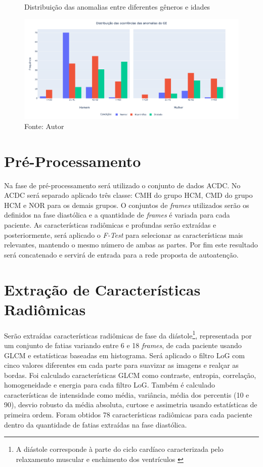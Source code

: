 \begin{figure}[htbp]
    \centering
    \caption{Distribuição das anomalias entre diferentes gêneros e idades}
    \includegraphics[width=1\textwidth]{figures/fig012.png}
    \caption*{Fonte: Autor}
    \label{fig:fig012}
\end{figure}

\section{Pré-Processamento}
\label{subsec:cap4_preprocess}

Na fase de pré-processamento será utilizado o conjunto de dados \gls{ACDC}. No \gls{ACDC} será separado aplicado três classe: \gls{CMH} do grupo HCM, \gls{CMD} do grupo HCM e NOR para os demais grupos. O conjuntos de \textit{frames} utilizados serão os definidos na fase diastólica e a quantidade de \textit{frames} é variada para cada paciente. As características radiômicas e profundas serão extraídas e posteriormente, será aplicado o \textit{F-Test} para selecionar as características mais relevantes, mantendo o mesmo número de ambas as partes. Por fim este resultado será concatenado e servirá de entrada para a rede proposta de autoatenção.

\section{Extração de Características Radiômicas}
\label{subsec:cap4_caracteristicas_radiomicas}

Serão extraídas características radiômicas de fase da diástole\footnote{A diástole corresponde à parte do ciclo cardíaco caracterizada pelo relaxamento muscular e enchimento dos ventrículos \cite{brielerCardiomyopathyOverview2017}}, representada por um conjunto de fatias variando entre 6 e 18 \textit{frames}, de cada paciente usando \gls{GLCM} e estatísticas baseadas em histograma. Será aplicado o filtro \gls{LoG} com cinco valores diferentes em cada parte para suavizar as imagens e realçar as bordas. Foi calculado características \gls{GLCM} como contraste, entropia, correlação, homogeneidade e energia para cada filtro \gls{LoG}. Também é calculado características de intensidade como média, variância, média dos percentis (10 e 90), desvio robusto da média absoluta, curtose e assimetria usando estatísticas de primeira ordem. Foram obtidos 78 características radiômicas para cada paciente dentro da quantidade de fatias extraídas na fase diastólica.

